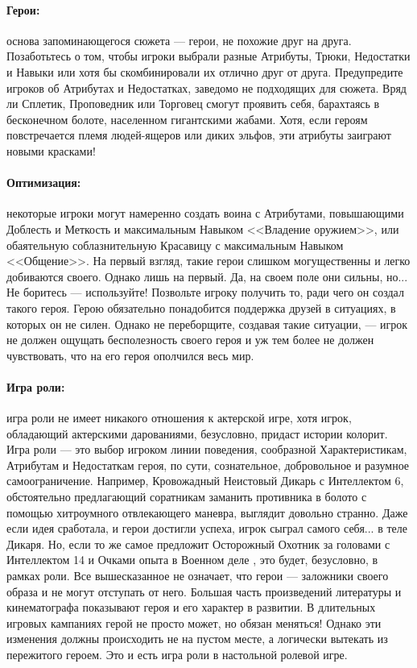\paragraph{Герои:} основа запоминающегося сюжета — герои, не похожие друг на друга. Позаботьтесь о том, чтобы игроки выбрали разные Атрибуты, Трюки, Недостатки и Навыки или хотя бы скомбинировали их отлично друг от друга. Предупредите игроков об Атрибутах и Недостатках, заведомо не подходящих для сюжета. Вряд ли Сплетик, Проповедник или Торговец смогут проявить себя, барахтаясь в бесконечном болоте, населенном гигантскими жабами. Хотя, если героям повстречается племя людей-ящеров или диких эльфов, эти атрибуты заиграют новыми красками!
\paragraph{Оптимизация:} некоторые игроки могут намеренно создать воина с Атрибутами, повышающими Доблесть и Меткость и максимальным Навыком <<Владение оружием>>, или обаятельную соблазнительную Красавицу с максимальным Навыком <<Общение>>. На первый взгляд, такие герои слишком могущественны и легко добиваются своего. Однако лишь на первый. Да, на своем поле они сильны, но... Не боритесь — используйте! Позвольте игроку получить то, ради чего он создал такого героя. Герою обязательно понадобится поддержка друзей в ситуациях, в которых он не силен. Однако не переборщите, создавая такие ситуации, — игрок не должен ощущать бесполезность своего героя и уж тем более не должен чувствовать, что на его героя ополчился весь мир.
\paragraph{Игра роли:} игра роли не имеет никакого отношения к актерской игре, хотя игрок, обладающий актерскими дарованиями, безусловно, придаст истории колорит. Игра роли — это выбор игроком линии поведения, сообразной Характеристикам, Атрибутам и Недостаткам героя, по сути, сознательное, добровольное и разумное самоограничение. Например, Кровожадный Неистовый Дикарь с Интеллектом 6, обстоятельно предлагающий соратникам заманить противника в болото с помощью хитроумного отвлекающего маневра, выглядит довольно странно. Даже если идея сработала, и герои достигли успеха, игрок сыграл самого себя... в теле Дикаря.
Но, если то же самое предложит Осторожный Охотник за головами с Интеллектом 14 и Очками опыта в Военном деле , это будет, безусловно, в рамках роли. Все вышесказанное не означает, что герои — заложники своего образа и не могут отступать от него. Большая часть произведений литературы и кинематографа показывают героя и его характер в развитии. В длительных игровых кампаниях герой не просто может, но обязан меняться! Однако эти изменения должны происходить не на пустом месте, а логически вытекать из пережитого героем. Это и есть игра роли в настольной ролевой игре.
